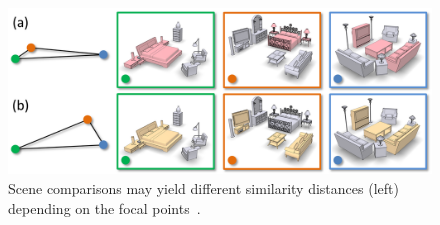 
\begin{figure}[t]
\centering
    \includegraphics[width=0.99\linewidth]{fig/img/xu_sig14_focal}
    \caption{
    Scene comparisons may yield different similarity distances (left) depending on the focal points~\protect\cite{Xu:2014:OHSC}.}
    \label{fig:xu_sig14_focal}
\end{figure}
